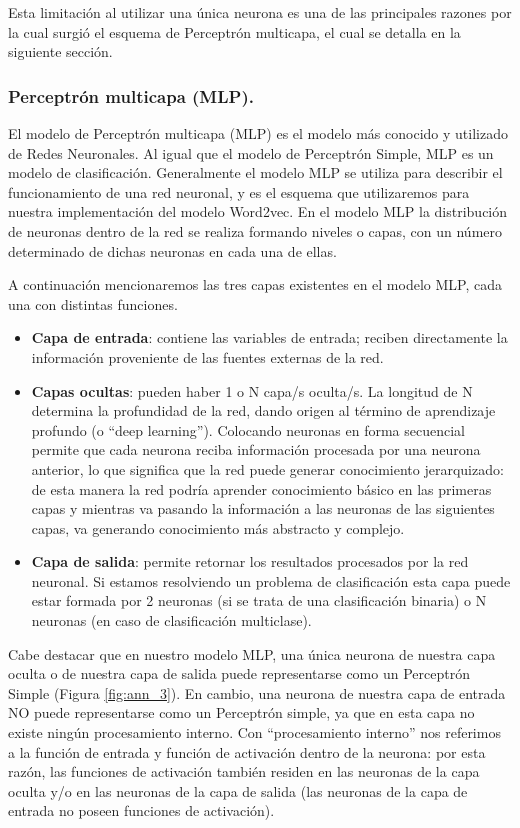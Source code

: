 \documentclass[12pt,a4paper]{article}
\begin{document}
\begin{sloppypar}
Esta limitación al utilizar una única neurona es una de las principales razones por la cual surgió el esquema de Perceptrón multicapa, el cual se detalla en la siguiente sección.

\subsubsection{Perceptrón multicapa (MLP).}

El modelo de Perceptrón multicapa (MLP) es el modelo más conocido y utilizado de Redes Neuronales. Al igual que el modelo de Perceptrón Simple, MLP es un modelo de clasificación. Generalmente el modelo MLP se utiliza para describir el funcionamiento de una red neuronal, y es el esquema que utilizaremos para nuestra implementación del modelo Word2vec. En el modelo MLP la distribución de neuronas dentro de la red se realiza formando niveles o capas, con un número determinado de dichas neuronas en cada una de ellas. 

A continuación mencionaremos las tres capas existentes en el modelo MLP, cada una con distintas funciones.
\begin{itemize}
\item \textbf{Capa de entrada}: contiene las variables de entrada; reciben directamente la información proveniente de las fuentes externas de la red.
\item \textbf{Capas ocultas}: pueden haber 1 o N capa/s oculta/s. La longitud de N determina la profundidad de la red, dando origen al término de aprendizaje profundo (o “deep learning”). Colocando neuronas en forma secuencial permite que cada neurona reciba información procesada por una neurona anterior, lo que significa que la red puede generar conocimiento jerarquizado: de esta manera la red podría aprender conocimiento básico en las primeras capas y mientras va pasando la información a las neuronas de las siguientes capas, va generando conocimiento más abstracto y complejo.
\item \textbf{Capa de salida}: permite retornar los resultados procesados por la red neuronal. Si estamos resolviendo un problema de clasificación esta capa puede estar formada por 2 neuronas (si se trata de una clasificación binaria) o N neuronas (en caso de clasificación multiclase). 
\end{itemize}

Cabe destacar que en nuestro modelo MLP, una única neurona de nuestra capa oculta o de nuestra capa de salida puede representarse como un Perceptrón Simple (Figura \ref{fig:ann_3}). En cambio, una neurona de nuestra capa de  entrada NO puede representarse como un Perceptrón simple, ya que en esta capa no existe ningún procesamiento interno. Con “procesamiento interno” nos referimos a la función de entrada y función de activación dentro de la neurona: por esta razón, las funciones de activación también residen en las neuronas de la capa oculta y/o en las neuronas de la capa de salida (las neuronas de la capa de entrada no poseen funciones de activación). 


\end{sloppypar}
\end{document}
